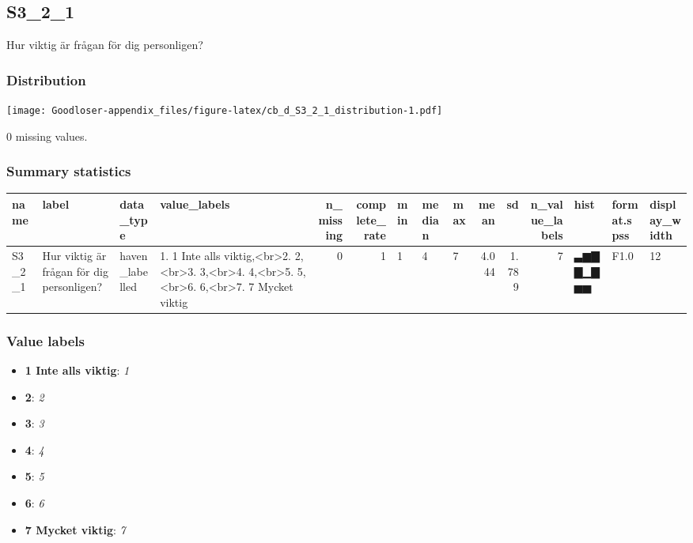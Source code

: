 \documentclass[
]{book}
\providecommand{\tightlist}{%
  \setlength{\itemsep}{0pt}\setlength{\parskip}{0pt}}
\begin{document}
\hypertarget{S3_2_1}{%
\subsection{S3\_2\_1}\label{S3_2_1}}

Hur viktig är frågan för dig personligen?

\hypertarget{S3_2_1_distribution}{%
\subsubsection{Distribution}\label{S3_2_1_distribution}}

\texttt{[image: Goodloser-appendix\_files/figure-latex/cb\_d\_S3\_2\_1\_distribution-1.pdf]}

0 missing values.

\hypertarget{S3_2_1_summary}{%
\subsubsection{Summary statistics}\label{S3_2_1_summary}}

\begin{tabular}{l|l|l|l|r|r|l|l|l|r|r|r|l|l|l}
\hline
name & label & data_type & value_labels & n_missing & complete_rate & min & median & max & mean & sd & n_value_labels & hist & format.spss & display_width\\
\hline
S3_2_1 & Hur viktig är frågan för dig personligen? & haven_labelled & 1. 1 Inte alls viktig,<br>2. 2,<br>3. 3,<br>4. 4,<br>5. 5,<br>6. 6,<br>7. 7 Mycket viktig & 0 & 1 & 1 & 4 & 7 & 4.044 & 1.789 & 7 & ▃▆▇▇▁▇▅▅ & F1.0 & 12\\
\hline
\end{tabular}

\hypertarget{S3_2_1_labels}{%
\subsubsection{Value labels}\label{S3_2_1_labels}}

\begin{itemize}
\tightlist
\item
  \textbf{1 Inte alls viktig}: \emph{1}
\item
  \textbf{2}: \emph{2}
\item
  \textbf{3}: \emph{3}
\item
  \textbf{4}: \emph{4}
\item
  \textbf{5}: \emph{5}
\item
  \textbf{6}: \emph{6}
\item
  \textbf{7 Mycket viktig}: \emph{7}
\end{itemize}
\end{document}
